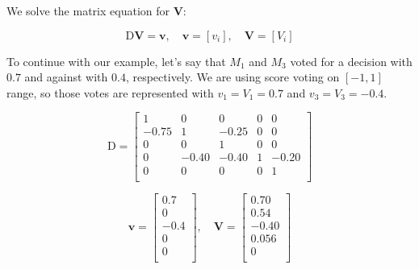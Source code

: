 \documentclass{sigchi}
\begin{document}
We solve the matrix equation for $\boldsymbol{V}$:

\begin{displaymath}
\mathrm{D} \boldsymbol{V} = \boldsymbol{v},\quad \boldsymbol{v} = \left[v_{i}\right],\quad \boldsymbol{V} = \left[V_{i}\right]
\end{displaymath}

To continue with our example, let's say that $M_1$ and $M_3$ voted for a decision with $0.7$ and against with $0.4$,
respectively.
We are using score voting on $[-1, 1]$ range, so those votes are represented with $v_1 = V_1 = 0.7$ and
$v_3 = V_3 = -0.4$.

\begin{displaymath}
\mathrm{D} = \left[ \begin{array}{ccccc}
1 & 0 & 0 & 0 & 0 \\
-0.75 & 1 & -0.25 & 0 & 0 \\
0 & 0 & 1 & 0 & 0 \\
0 & -0.40 & -0.40 & 1 & -0.20 \\
0 & 0 & 0 & 0 & 1 \\
\end{array} \right]
\end{displaymath}

\begin{displaymath}
\boldsymbol{v} = \left[ \begin{array}{c}
0.7 \\
0 \\
-0.4 \\
0 \\
0 \\
\end{array} \right],\quad \boldsymbol{V} = \left[ \begin{array}{c}
0.70 \\
0.54 \\
-0.40 \\
0.056 \\
0 \\
\end{array} \right]
\end{displaymath}

\end{document}
